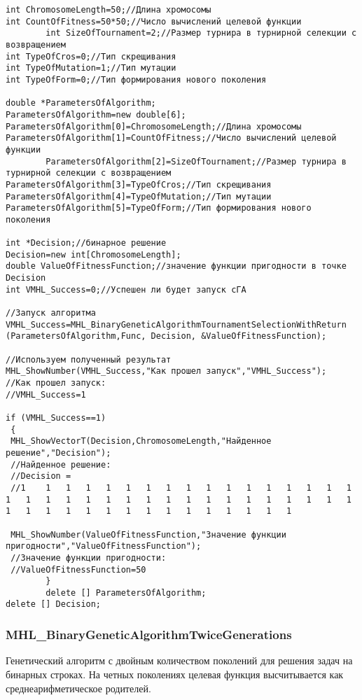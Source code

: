 \documentclass[a4paper,12pt]{article}
\begin{document}
\begin{lstlisting}[label=code_use_MHL_BinaryGeneticAlgorithmTournamentSelectionWithReturn,caption=Пример использования]
int ChromosomeLength=50;//Длина хромосомы
int CountOfFitness=50*50;//Число вычислений целевой функции
		int SizeOfTournament=2;//Размер турнира в турнирной селекции с возвращением
int TypeOfCros=0;//Тип скрещивания
int TypeOfMutation=1;//Тип мутации
int TypeOfForm=0;//Тип формирования нового поколения

double *ParametersOfAlgorithm;
ParametersOfAlgorithm=new double[6];
ParametersOfAlgorithm[0]=ChromosomeLength;//Длина хромосомы
ParametersOfAlgorithm[1]=CountOfFitness;//Число вычислений целевой функции
		ParametersOfAlgorithm[2]=SizeOfTournament;//Размер турнира в турнирной селекции с возвращением
ParametersOfAlgorithm[3]=TypeOfCros;//Тип скрещивания
ParametersOfAlgorithm[4]=TypeOfMutation;//Тип мутации
ParametersOfAlgorithm[5]=TypeOfForm;//Тип формирования нового поколения

int *Decision;//бинарное решение
Decision=new int[ChromosomeLength];
double ValueOfFitnessFunction;//значение функции пригодности в точке Decision
int VMHL_Success=0;//Успешен ли будет запуск cГА

//Запуск алгоритма
VMHL_Success=MHL_BinaryGeneticAlgorithmTournamentSelectionWithReturn (ParametersOfAlgorithm,Func, Decision, &ValueOfFitnessFunction);

//Используем полученный результат
MHL_ShowNumber(VMHL_Success,"Как прошел запуск","VMHL_Success");
//Как прошел запуск:
//VMHL_Success=1

if (VMHL_Success==1)
 {
 MHL_ShowVectorT(Decision,ChromosomeLength,"Найденное решение","Decision");
 //Найденное решение:
 //Decision =
 //1	1	1	1	1	1	1	1	1	1	1	1	1	1	1	1	1	1	1	1	1	1	1	1	1	1	1	1	1	1	1	1	1	1	1	1	1	1	1	1	1	1	1	1	1	1	1	1	1	1

 MHL_ShowNumber(ValueOfFitnessFunction,"Значение функции пригодности","ValueOfFitnessFunction");
 //Значение функции пригодности:
 //ValueOfFitnessFunction=50
		}
		delete [] ParametersOfAlgorithm;
delete [] Decision;
\end{lstlisting}

\subsubsection{MHL\_BinaryGeneticAlgorithmTwiceGenerations}\label{MHL_BinaryGeneticAlgorithmTwiceGenerations}

Генетический алгоритм с двойным количеством поколений для решения задач на бинарных строках. На четных поколениях целевая функция высчитывается как среднеарифметическое родителей.
\end{document}
